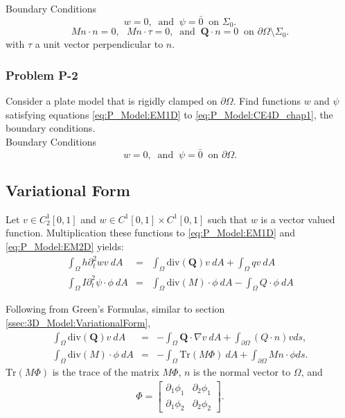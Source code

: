 \documentclass[../../main.tex]{subfiles}
\begin{document}
	Boundary Conditions\\
	\[w = 0,  \ \textrm{ and } \ \psi = \bar{0} \ \textrm{ on } \Sigma_0.\]
	\[Mn\cdot n = 0,\ \ \ Mn\cdot \tau = 0, \ \textrm{ and } \ \mathbf{Q} \cdot n =0 \ \textrm{ on } \partial\Omega\setminus\Sigma_0.\]
	with $\tau$ a unit vector perpendicular to $n$.\\
	
	\subsubsection{Problem P-2}\label{sssec:P_Model:ProblemP2}
	Consider a plate model that is rigidly clamped on $\partial \Omega$. Find functions $w$ and $\psi$ satisfying equations \eqref{eq:P_Model:EM1D} to \eqref{eq:P_Model:CE4D_chap1}, the boundary conditions.\\
	
	Boundary Conditions\\
	\[w = 0,  \ \textrm{ and } \ \psi = \bar{0} \ \textrm{ on } \partial \Omega.\]
	
	
	\subsection{Variational Form}\label{ssec:P_Model:VariationalForm}
	Let $v \in C_2^1[0,1]$ and $w \in C^1[0,1] \times C^1[0,1]$ such that $w$ is a vector valued function. Multiplication these functions to \eqref{eq:P_Model:EM1D} and \eqref{eq:P_Model:EM2D} yields:
	\begin{eqnarray*}
		\int_\Omega h \partial_t^2 w v \ dA & = & \int_\Omega \textrm{div} (\mathbf{Q}) v \ dA + \int_\Omega q v \ dA\\
		\int_\Omega I \partial_t^2 \psi \cdot \phi \ dA & = & \int_\Omega \textrm{div} (M) \cdot \phi \ dA - \int_\Omega Q \cdot \phi \ dA
	\end{eqnarray*}
	
	Following from Green's Formulas, similar to section \ref{ssec:3D_Model:VariationalForm}, 
	\begin{eqnarray*}
		\int_\Omega \textrm{div}(\mathbf{Q}) v \ dA & = & - \int_\Omega \mathbf{Q} \cdot \nabla v \ dA + \int_{\partial\Omega} (Q\cdot n)v ds,\\
		\int_\Omega \textrm{div}(M) \cdot \phi \ dA & = & - \int_\Omega \textrm{Tr} (M \Phi) \ dA + \int_{\partial\Omega} M n \cdot \phi ds.
	\end{eqnarray*}
	$\textrm{Tr} (M \Phi)$ is the trace of the matrix $M \Phi$, $n$ is the normal vector to $\Omega$, and 
	\begin{eqnarray*}
		\Phi = 
		\begin{bmatrix}
			\partial_1\phi_1 & \partial_2\phi_1\\
			\partial_1\phi_2 & \partial_2\phi_2
		\end{bmatrix}.
	\end{eqnarray*}
	
\end{document}
